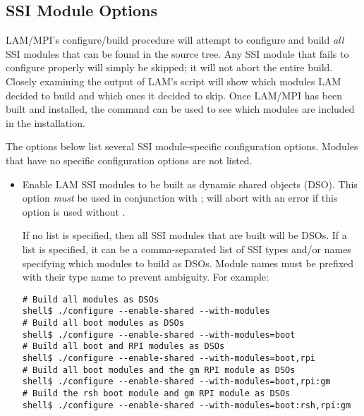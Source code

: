 
\subsection{SSI Module Options}
\label{sec:configure:options:ssi}

LAM/MPI's configure/build procedure will attempt to configure and
build {\em all} SSI modules that can be found in the source tree.  Any
SSI module that fails to configure properly will simply be skipped; it
will not abort the entire build.  Closely examining the output of
LAM's  script will show which modules LAM decided to
build and which ones it decided to skip.  Once LAM/MPI has been built
and installed, the  command can be used to see which
modules are included in the installation.

The options below list several SSI module-specific configuration
options.  Modules that have no specific configuration options are not
listed.


\begin{itemize}

\item {}

  Enable LAM SSI modules to be built as dynamic shared objects (DSO).
  This option {\em must} be used in conjunction with
  ;  will abort with an error
  if this option is used without .
  
  If no list is specified, then all SSI modules that are built will be
  DSOs.  If a list is specified, it can be a comma-separated list of
  SSI types and/or names specifying which modules to build as DSOs.
  Module names must be prefixed with their type name to prevent
  ambiguity.  For example:

\lstset{style=lam-cmdline}
\begin{lstlisting}
# Build all modules as DSOs
shell$ ./configure --enable-shared --with-modules
# Build all boot modules as DSOs
shell$ ./configure --enable-shared --with-modules=boot
# Build all boot and RPI modules as DSOs
shell$ ./configure --enable-shared --with-modules=boot,rpi
# Build all boot modules and the gm RPI module as DSOs
shell$ ./configure --enable-shared --with-modules=boot,rpi:gm
# Build the rsh boot module and gm RPI module as DSOs
shell$ ./configure --enable-shared --with-modules=boot:rsh,rpi:gm
\end{lstlisting}

\end{itemize}

